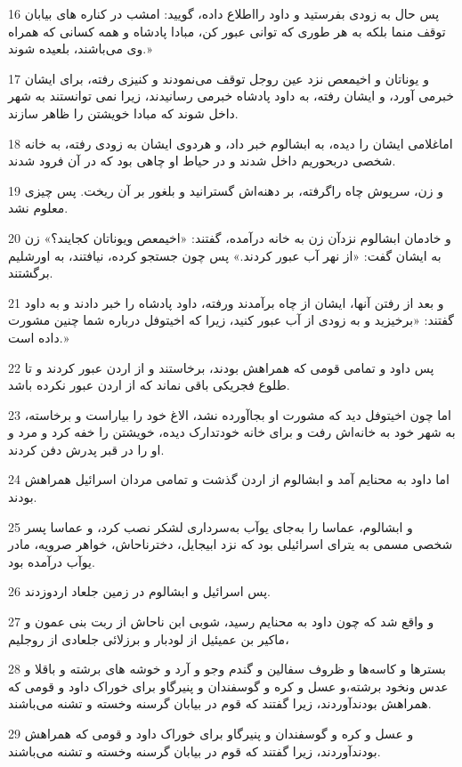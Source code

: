 \par 16 پس حال به زودی بفرستید و داود رااطلاع داده، گویید: امشب در کناره های بیابان توقف منما بلکه به هر طوری که توانی عبور کن، مبادا پادشاه و همه کسانی که همراه وی می‌باشند، بلعیده شوند.»
\par 17 و یوناتان و اخیمعص نزد عین روجل توقف می‌نمودند و کنیزی رفته، برای ایشان خبرمی آورد، و ایشان رفته، به داود پادشاه خبرمی رسانیدند، زیرا نمی توانستند به شهر داخل شوند که مبادا خویشتن را ظاهر سازند.
\par 18 اماغلامی ایشان را دیده، به ابشالوم خبر داد، و هردوی ایشان به زودی رفته، به خانه شخصی دربحوریم داخل شدند و در حیاط او چاهی بود که در آن فرود شدند.
\par 19 و زن، سرپوش چاه راگرفته، بر دهنه‌اش گسترانید و بلغور بر آن ریخت. پس چیزی معلوم نشد.
\par 20 و خادمان ابشالوم نزدآن زن به خانه درآمده، گفتند: «اخیمعص ویوناتان کجایند؟» زن به ایشان گفت: «از نهر آب عبور کردند.» پس چون جستجو کرده، نیافتند، به اورشلیم برگشتند.
\par 21 و بعد از رفتن آنها، ایشان از چاه برآمدند ورفته، داود پادشاه را خبر دادند و به داود گفتند: «برخیزید و به زودی از آب عبور کنید، زیرا که اخیتوفل درباره شما چنین مشورت داده است.» 
\par 22 پس داود و تمامی قومی که همراهش بودند، برخاستند و از اردن عبور کردند و تا طلوع فجریکی باقی نماند که از اردن عبور نکرده باشد.
\par 23 اما چون اخیتوفل دید که مشورت او بجاآورده نشد، الاغ خود را بیاراست و برخاسته، به شهر خود به خانه‌اش رفت و برای خانه خودتدارک دیده، خویشتن را خفه کرد و مرد و او را در قبر پدرش دفن کردند.
\par 24 اما داود به محنایم آمد و ابشالوم از اردن گذشت و تمامی مردان اسرائیل همراهش بودند.
\par 25 و ابشالوم، عماسا را به‌جای یوآب به‌سرداری لشکر نصب کرد، و عماسا پسر شخصی مسمی به یترای اسرائیلی بود که نزد ابیجایل، دخترناحاش، خواهر صرویه، مادر یوآب درآمده بود.
\par 26 پس اسرائیل و ابشالوم در زمین جلعاد اردوزدند.
\par 27 و واقع شد که چون داود به محنایم رسید، شوبی ابن ناحاش از ربت بنی عمون و ماکیر بن عمیئیل از لودبار و برزلائی جلعادی از روجلیم،
\par 28 بسترها و کاسه‌ها و ظروف سفالین و گندم وجو و آرد و خوشه های برشته و باقلا و عدس ونخود برشته،و عسل و کره و گوسفندان و پنیرگاو برای خوراک داود و قومی که همراهش بودندآوردند، زیرا گفتند که قوم در بیابان گرسنه وخسته و تشنه می‌باشند.
\par 29 و عسل و کره و گوسفندان و پنیرگاو برای خوراک داود و قومی که همراهش بودندآوردند، زیرا گفتند که قوم در بیابان گرسنه وخسته و تشنه می‌باشند.
 
